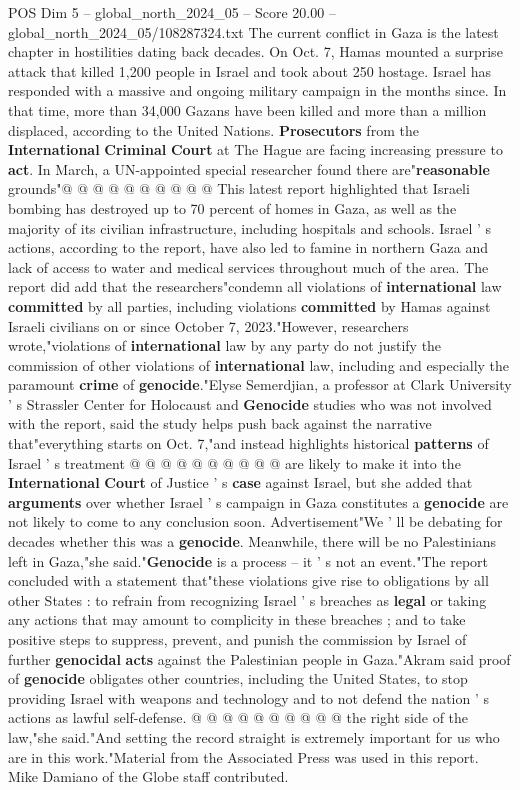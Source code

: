 \begin{textsample}{POS Dim 5 – global\_north\_2024\_05 – Score 20.00 – global\_north\_2024\_05/108287324.txt}
The current conflict in Gaza is the latest chapter in hostilities dating back decades.
On Oct. 7, Hamas mounted a surprise attack that killed 1,200 people in Israel and took about 250 hostage.
Israel has responded with a massive and ongoing military campaign in the months since.
In that time, more than 34,000 Gazans have been killed and more than a million displaced, according to the United Nations. \textbf{Prosecutors} from the \textbf{International} \textbf{Criminal} \textbf{Court} at The Hague are facing increasing pressure to \textbf{act}.
In March, a UN-appointed special researcher found there are"\textbf{reasonable} grounds"@ @ @ @ @ @ @ @ @ @ This latest report highlighted that Israeli bombing has destroyed up to 70 percent of homes in Gaza, as well as the majority of its civilian infrastructure, including hospitals and schools.
Israel ' s actions, according to the report, have also led to famine in northern Gaza and lack of access to water and medical services throughout much of the area.
The report did add that the researchers"condemn all violations of \textbf{international} law \textbf{committed} by all parties, including violations \textbf{committed} by Hamas against Israeli civilians on or since October 7, 2023."However, researchers wrote,"violations of \textbf{international} law by any party do not justify the commission of other violations of \textbf{international} law, including and especially the paramount \textbf{crime} of \textbf{genocide}."Elyse Semerdjian, a professor at Clark University ' s Strassler Center for Holocaust and \textbf{Genocide} studies who was not involved with the report, said the study helps push back against the narrative that"everything starts on Oct. 7,"and instead highlights historical \textbf{patterns} of Israel ' s treatment @ @ @ @ @ @ @ @ @ @ are likely to make it into the \textbf{International} \textbf{Court} of Justice ' s \textbf{case} against Israel, but she added that \textbf{arguments} over whether Israel ' s campaign in Gaza constitutes a \textbf{genocide} are not likely to come to any conclusion soon.
Advertisement"We ' ll be debating for decades whether this was a \textbf{genocide}.
Meanwhile, there will be no Palestinians left in Gaza,"she said."\textbf{Genocide} is a process -- it ' s not an event."The report concluded with a statement that"these violations give rise to obligations by all other States : to refrain from recognizing Israel ' s breaches as \textbf{legal} or taking any actions that may amount to complicity in these breaches ; and to take positive steps to suppress, prevent, and punish the commission by Israel of further \textbf{genocidal} \textbf{acts} against the Palestinian people in Gaza."Akram said proof of \textbf{genocide} obligates other countries, including the United States, to stop providing Israel with weapons and technology and to not defend the nation ' s actions as lawful self-defense. @ @ @ @ @ @ @ @ @ @ the right side of the law,"she said."And setting the record straight is extremely important for us who are in this work."Material from the Associated Press was used in this report.
Mike Damiano of the Globe staff contributed.


\end{textsample}
